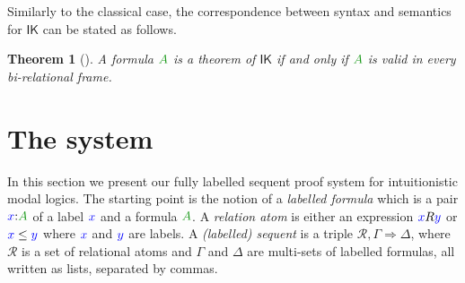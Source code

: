 \documentclass[a4paper]{article}
\theoremstyle{plain}
\newtheorem{theorem}{Theorem}[section]
\theoremstyle{definition}
\newcommand*{\IK}{\mathsf{IK}}
\newcommand{\lseq}[3]{#1 , #2 \SEQ #3}
\newcommand{\B}{\mathcal{R}}
\newcommand{\Left}{\Gamma} %
\newcommand{\Right}{\Delta} %
\newcommand*{\fm}[1]{{\color{notgreen}{#1}}}
\newcommand*{\lb}[1]{{\color{blue}{#1}}}
\newcommand*{\labels}[2]{\lb{#1}\mathord{:}\fm{#2}}
\newcommand*{\accs}[2]{\lb{#1}R\lb{#2}}
\newcommand*{\futs}[2]{\lb{#1}\le{\lb{#2}}}
\newcommand{\SEQ}{\Longrightarrow}
\begin{document}
 Similarly to the classical case, the correspondence between syntax and semantics for $\IK$ can be stated as follows.
 
 \begin{theorem}[\cite{fischer-servi:84,plotkin:stirling:86}]\label{thm:plotkin}
 	A formula $\fm A$ is a theorem of $\IK$ if and only if $\fm A$ is valid in every bi-relational frame.
 \end{theorem}
 \section{The system}\label{sec:system}
 
 In this section we present our fully labelled sequent proof system
 for intuitionistic modal logics. The starting point is the notion of a
 \emph{labelled formula} which is a pair $\labels xA$ of a label $\lb
 x$ and a formula $\fm A$. 
 A \emph{relation atom} is either an expression
 $\accs xy$ or $\futs xy$ where $\lb x$ and $\lb y$ are labels. 
 A \emph{(labelled) sequent} is a triple $\lseq\B\Left\Right$,
 where $\B$ is a set of relational atoms and $\Left$ and $\Right$ are multi-sets of labelled formulas, all written as lists, separated by commas.
 
\end{document}
